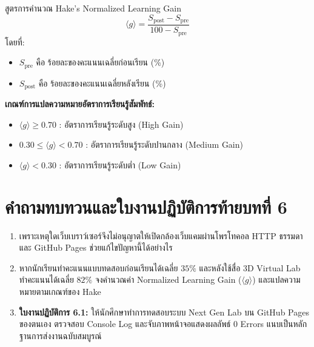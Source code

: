 \begin{theoremlab}{สูตรการคำนวณ Hake's Normalized Learning Gain}
\begin{equation}
\langle g \rangle = \frac{S_{\text{post}} - S_{\text{pre}}}{100 - S_{\text{pre}}}
\end{equation}
โดยที่:
\begin{itemize}[leftmargin=1.5em, itemsep=2pt]
    \item $S_{\text{pre}}$ คือ ร้อยละของคะแนนเฉลี่ยก่อนเรียน (\%)
    \item $S_{\text{post}}$ คือ ร้อยละของคะแนนเฉลี่ยหลังเรียน (\%)
\end{itemize}
\textbf{เกณฑ์การแปลความหมายอัตราการเรียนรู้สัมพัทธ์:}
\begin{itemize}[leftmargin=1.5em, itemsep=2pt]
    \item $\langle g \rangle \ge 0.70$ : อัตราการเรียนรู้ระดับสูง (High Gain)
    \item $0.30 \le \langle g \rangle < 0.70$ : อัตราการเรียนรู้ระดับปานกลาง (Medium Gain)
    \item $\langle g \rangle < 0.30$ : อัตราการเรียนรู้ระดับต่ำ (Low Gain)
\end{itemize}
\end{theoremlab}

\section*{คำถามทบทวนและใบงานปฏิบัติการท้ายบทที่ 6}

\begin{enumerate}[leftmargin=1.5em, itemsep=8pt]
    \item เพราะเหตุใดเว็บเบราว์เซอร์จึงไม่อนุญาตให้เปิดกล้องเว็บแคมผ่านโพรโทคอล HTTP ธรรมดา และ GitHub Pages ช่วยแก้ไขปัญหานี้ได้อย่างไร
    \item หากนักเรียนทำคะแนนแบบทดสอบก่อนเรียนได้เฉลี่ย $35\%$ และหลังใช้สื่อ 3D Virtual Lab ทำคะแนนได้เฉลี่ย $82\%$ จงคำนวณค่า Normalized Learning Gain ($\langle g \rangle$) และแปลความหมายตามเกณฑ์ของ Hake
    \item \textbf{ใบงานปฏิบัติการ 6.1:} ให้นักศึกษาทำการทดสอบระบบ Next Gen Lab บน GitHub Pages ของตนเอง ตรวจสอบ Console Log และจับภาพหน้าจอแสดงผลลัพธ์ 0 Errors แนบเป็นหลักฐานการส่งงานฉบับสมบูรณ์
\end{enumerate}
